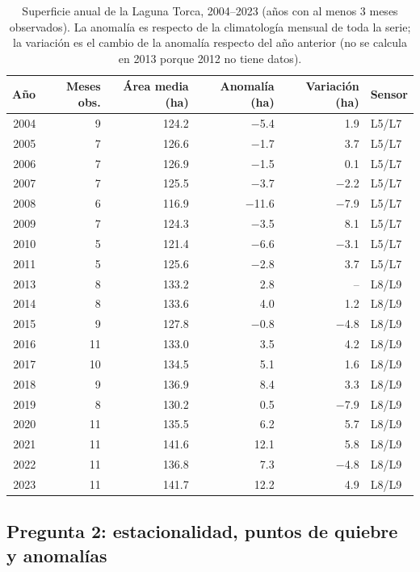 \documentclass[11pt,a4paper]{article}
\begin{document}
\begin{table}[H]
\centering
\caption{Superficie anual de la Laguna Torca, 2004--2023 (años con al menos 3 meses observados). La anomalía es respecto de la climatología mensual de toda la serie; la variación es el cambio de la anomalía respecto del año anterior (no se calcula en 2013 porque 2012 no tiene datos).}
\label{tab:anual}
\small
\begin{tabular}{rrrrrl}
\toprule
Año & Meses obs. & Área media (ha) & Anomalía (ha) & Variación (ha) & Sensor \\
\midrule
2004 & 9 & 124.2 & $-$5.4 & 1.9 & L5/L7 \\
2005 & 7 & 126.6 & $-$1.7 & 3.7 & L5/L7 \\
2006 & 7 & 126.9 & $-$1.5 & 0.1 & L5/L7 \\
2007 & 7 & 125.5 & $-$3.7 & $-$2.2 & L5/L7 \\
2008 & 6 & 116.9 & $-$11.6 & $-$7.9 & L5/L7 \\
2009 & 7 & 124.3 & $-$3.5 & 8.1 & L5/L7 \\
2010 & 5 & 121.4 & $-$6.6 & $-$3.1 & L5/L7 \\
2011 & 5 & 125.6 & $-$2.8 & 3.7 & L5/L7 \\
2013 & 8 & 133.2 & 2.8 & -- & L8/L9 \\
2014 & 8 & 133.6 & 4.0 & 1.2 & L8/L9 \\
2015 & 9 & 127.8 & $-$0.8 & $-$4.8 & L8/L9 \\
2016 & 11 & 133.0 & 3.5 & 4.2 & L8/L9 \\
2017 & 10 & 134.5 & 5.1 & 1.6 & L8/L9 \\
2018 & 9 & 136.9 & 8.4 & 3.3 & L8/L9 \\
2019 & 8 & 130.2 & 0.5 & $-$7.9 & L8/L9 \\
2020 & 11 & 135.5 & 6.2 & 5.7 & L8/L9 \\
2021 & 11 & 141.6 & 12.1 & 5.8 & L8/L9 \\
2022 & 11 & 136.8 & 7.3 & $-$4.8 & L8/L9 \\
2023 & 11 & 141.7 & 12.2 & 4.9 & L8/L9 \\
\bottomrule
\end{tabular}
\end{table}


\subsection{Pregunta 2: estacionalidad, puntos de quiebre y anomalías}
\end{document}
